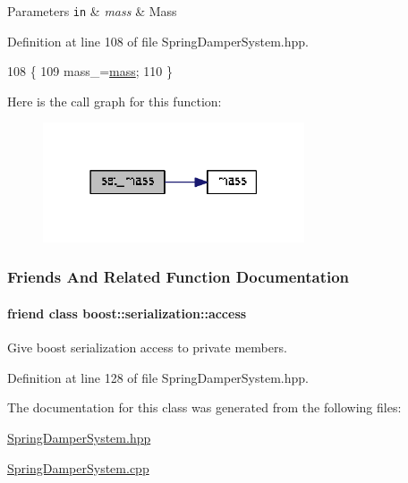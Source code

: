 \begin{DoxyParams}[1]{Parameters}
\mbox{\tt in}  & {\em mass} & Mass \\
\hline
\end{DoxyParams}


Definition at line 108 of file Spring\+Damper\+System.\+hpp.


\begin{DoxyCode}
108                                     \{ 
109     mass\_=\hyperlink{classDmpBbo_1_1SpringDamperSystem_a387fcfdb067c6de3be9bfd61b868b839}{mass}; 
110   \}
\end{DoxyCode}


Here is the call graph for this function\+:
\nopagebreak
\begin{figure}[H]
\begin{center}
\leavevmode
\includegraphics[width=219pt]{classDmpBbo_1_1SpringDamperSystem_afd917e12a5f9a7131886704606f2fa44_cgraph}
\end{center}
\end{figure}




\subsubsection{Friends And Related Function Documentation}
\hypertarget{classDmpBbo_1_1SpringDamperSystem_ac98d07dd8f7b70e16ccb9a01abf56b9c}{
\paragraph[{boost\+::serialization\+::access}]{\setlength{\rightskip}{0pt plus 5cm}friend class boost\+::serialization\+::access\hspace{0.3cm}{\ttfamily [friend]}}}\label{classDmpBbo_1_1SpringDamperSystem_ac98d07dd8f7b70e16ccb9a01abf56b9c}


Give boost serialization access to private members. 



Definition at line 128 of file Spring\+Damper\+System.\+hpp.



The documentation for this class was generated from the following files\+:\begin{DoxyCompactItemize}
\item 
\hyperlink{SpringDamperSystem_8hpp}{Spring\+Damper\+System.\+hpp}\item 
\hyperlink{SpringDamperSystem_8cpp}{Spring\+Damper\+System.\+cpp}\end{DoxyCompactItemize}
